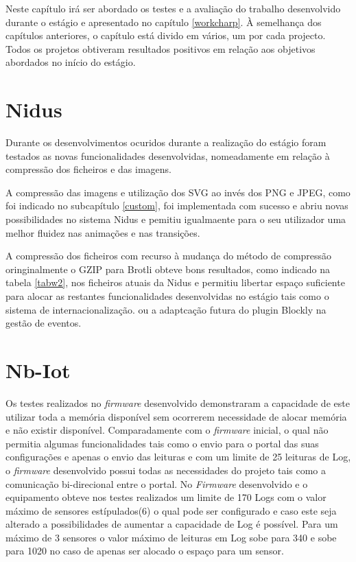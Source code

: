 \par Neste capítulo irá ser abordado os testes e a avaliação do trabalho desenvolvido durante o estágio e apresentado no capítulo \ref{workcharp}. À semelhança dos capítulos anteriores, o capítulo está divido em vários, um por cada projecto. Todos os projetos obtiveram resultados positivos em relação aos objetivos abordados no início do estágio.

\section{Nidus}

\par Durante os desenvolvimentos ocuridos durante a realização do estágio foram testados as novas funcionalidades desenvolvidas, nomeadamente em relação à compressão dos ficheiros e das imagens. 
\par A compressão das imagens e utilização dos SVG ao invés dos PNG e JPEG, como foi indicado no subcapítulo \ref{custom}, foi implementada com sucesso e abriu novas possibilidades  no sistema Nidus e pemitiu igualmaente para o seu utilizador uma melhor fluidez nas animações e nas transições.
\par A compressão dos ficheiros com recurso à mudança do método de compressão oringinalmente o GZIP para Brotli obteve bons resultados, como indicado na tabela \ref{tabw2}, nos ficheiros atuais da Nidus e permitiu libertar espaço suficiente para alocar as restantes funcionalidades desenvolvidas no estágio tais como o sistema de internacionalização. ou a adaptcação futura do plugin Blockly na gestão de eventos.

\section{Nb-Iot}

\par Os testes realizados no \textit{firmware} desenvolvido demonstraram a capacidade de este utilizar toda a memória disponível sem ocorrerem necessidade de alocar memória e não existir disponível. Comparadamente com o \textit{firmware} inicial, o qual não permitia algumas funcionalidades tais como o envio para o portal das suas configurações e apenas o envio das leituras e com um limite de 25 leituras de Log, o \textit{firmware} desenvolvido possui todas as necessidades do projeto tais como a comunicação bi-direcional entre o portal. No \textit{Firmware} desenvolvido e o equipamento obteve nos testes realizados um limite de 170 Logs com o valor máximo de sensores estípulados(6) o qual pode ser configurado e caso este seja alterado a possibilidades de aumentar a capacidade de Log é possível. Para um máximo de 3 sensores o valor máximo de leituras em Log sobe para 340 e sobe para 1020 no caso de apenas ser alocado o espaço para um sensor.

